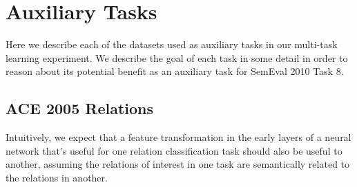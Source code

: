 \section{Auxiliary Tasks}
\label{auxiliary_tasks}
Here we describe each of the datasets used as auxiliary tasks in our multi-task learning experiment. We describe the goal of each task in some detail in order to reason about its potential benefit as an auxiliary task for SemEval 2010 Task 8.

\subsection{ACE 2005 Relations}
Intuitively, we expect that a feature transformation in the early layers of a neural network that's useful for one relation classification task should also be useful to another, assuming the relations of interest in one task are semantically related to the relations in another.

